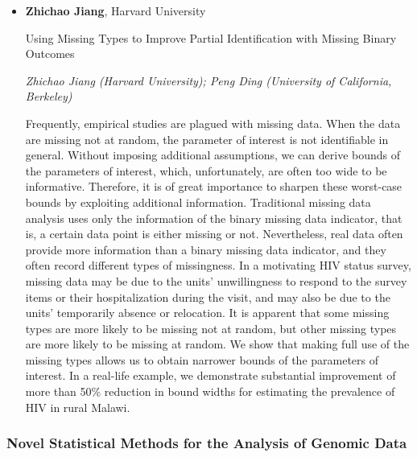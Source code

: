 \begin{itemize}
\item \textbf{Zhichao Jiang}, Harvard University

Using Missing Types to Improve Partial Identification with Missing Binary Outcomes

\emph{\footnotesize Zhichao Jiang (Harvard University); Peng Ding (University of California, Berkeley)}

Frequently, empirical studies are plagued with missing data. When the data are missing not at random, the parameter of interest is not identifiable in general. Without imposing additional assumptions, we can derive bounds of the parameters of interest, which, unfortunately, are often too wide to be informative. Therefore, it is of great importance to sharpen these worst-case bounds by exploiting additional information.  Traditional missing data analysis uses only the information of the binary missing data indicator, that is, a certain data point is either missing or not. Nevertheless, real data often provide more information than a binary missing data indicator, and they often record different types of missingness. In a motivating HIV status survey, missing data may be due to the units' unwillingness to respond to the survey items or their hospitalization during the visit, and may also be due to the units' temporarily absence or relocation. It is apparent that some missing types are more likely to be missing not at random, but  other missing types are more likely to be missing at random. We show that making full use of the missing types allows us to obtain narrower bounds of the parameters of interest. In a real-life example, we demonstrate substantial improvement of more than 50\% reduction in bound widths for estimating the prevalence of HIV in rural Malawi.

\end{itemize}

\subsubsection*{Novel Statistical Methods for the Analysis of Genomic Data}

